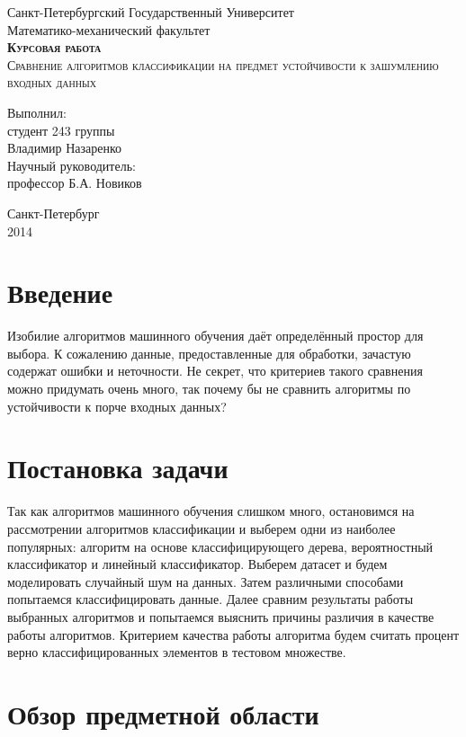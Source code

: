 \documentclass{article}
\begin{document}
\begin{titlepage}

\begin{center}
Санкт-Петербургский Государственный Университет\\
Математико-механический факультет\\
\vspace{12em}
\textsc{\textbf{Курсовая работа\\}Сравнение алгоритмов классификации на предмет устойчивости к зашумлению входных данных}
\end{center}
\vspace{10em}
\begin{flushright}
Выполнил:\\
студент 243 группы\\
Владимир Назаренко\\
\vspace{1em}
Научный руководитель:\\
профессор Б.А. Новиков
\end{flushright}
\vspace{\fill}
\center
Санкт-Петербург\\2014
\end{titlepage}
\section{Введение}
Изобилие алгоритмов машинного обучения даёт определённый простор для выбора. К сожалению данные, предоставленные для обработки, зачастую содержат ошибки и неточности. Не секрет, что критериев такого сравнения можно придумать очень много, так почему бы не сравнить алгоритмы по устойчивости к порче входных данных? 
\section{Постановка задачи}
Так как алгоритмов машинного обучения слишком много, остановимся на рассмотрении алгоритмов классификации и выберем одни из наиболее популярных:
алгоритм на основе классифицирующего дерева, вероятностный классификатор и линейный классификатор. Выберем датасет и будем моделировать случайный шум на данных. Затем различными способами попытаемся классифицировать данные.
Далее сравним результаты работы выбранных алгоритмов и попытаемся выяснить причины различия в качестве работы алгоритмов. Критерием качества работы алгоритма будем считать процент верно классифицированных элементов в тестовом множестве.
\section{Обзор предметной области}
\end{document}
